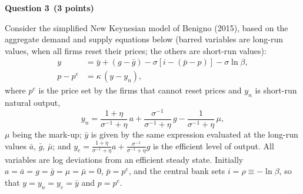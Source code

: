 \documentclass[11pt,a4paper]{article}
\newcommand{\questao}[3]{\Needspace{12\baselineskip}\bigskip\noindent
  {\large\bfseries\color{blue!55!black}Question #1}\ \textbf{(#2 points)}\par\smallskip\noindent #3\par}
\begin{document}
\questao{3}{3}{Consider the simplified New Keynesian model of Benigno (2015), based on the aggregate
demand and supply equations below (barred variables are long-run values, when all firms reset their
prices; the others are short-run values):
\begin{align}
y &= \bar y+(g-\bar g)-\sigma\left[i-(\bar p-p)\right]-\sigma\ln\beta, \tag{AD}\label{q3:AD}\\
p-p^e &= \kappa\,(y-y_n), \tag{AS}\label{q3:AS}
\end{align}
where $p^e$ is the price set by the firms that cannot reset prices and $y_n$ is short-run natural output,
\begin{equation}
y_n=\frac{1+\eta}{\sigma^{-1}+\eta}\,a+\frac{\sigma^{-1}}{\sigma^{-1}+\eta}\,g-\frac{1}{\sigma^{-1}+\eta}\,\mu , \tag{YN}\label{q3:YN}
\end{equation}
$\mu$ being the mark-up; $\bar y$ is given by the same expression evaluated at the long-run values
$\bar a$, $\bar g$, $\bar\mu$; and $y_e=\frac{1+\eta}{\sigma^{-1}+\eta}a+\frac{\sigma^{-1}}{\sigma^{-1}+\eta}g$ is the
efficient level of output. All variables are log deviations from an efficient steady state. Initially
$a=\bar a=g=\bar g=\mu=\bar\mu=0$, $\bar p=p^e$, and the central bank sets $i=\rho\equiv-\ln\beta$, so that
$y=y_n=y_e=\bar y$ and $p=p^e$.}
\end{document}
